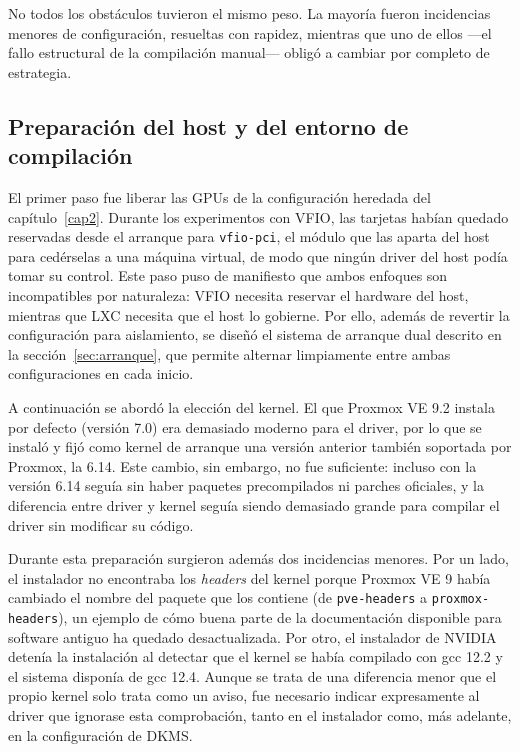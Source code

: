 No todos los obstáculos tuvieron el mismo peso. La mayoría fueron incidencias menores de configuración, resueltas con rapidez, mientras que uno de ellos ---el fallo estructural de la compilación manual--- obligó a cambiar por completo de estrategia.

\subsection{Preparación del host y del entorno de compilación} \label{sec:cap3-preparacion}

El primer paso fue liberar las GPUs de la configuración heredada del capítulo~\ref{cap2}. Durante los 
experimentos con VFIO, las tarjetas habían quedado reservadas desde el arranque para \texttt{vfio-pci}, 
el módulo que las aparta del host para cedérselas a una máquina virtual, de modo que ningún driver del host 
podía tomar su control. Este paso puso de manifiesto que ambos enfoques son incompatibles por naturaleza: 
VFIO necesita reservar el hardware del host, mientras que LXC necesita que el host lo gobierne. Por ello, 
además de revertir la configuración para aislamiento, se diseñó el sistema de arranque dual descrito en la sección~\ref{sec:arranque},
que permite alternar limpiamente entre ambas configuraciones en cada inicio.

A continuación se abordó la elección del kernel. El que Proxmox VE 9.2 instala por defecto (versión 7.0) era demasiado moderno para el driver, por lo que se instaló y fijó como kernel de arranque una versión anterior también soportada por Proxmox, la 6.14. Este cambio, sin embargo,
no fue suficiente: incluso con la versión 6.14 seguía sin haber paquetes precompilados ni parches oficiales, y la diferencia entre driver y kernel seguía siendo demasiado grande para compilar el driver sin modificar su código.

Durante esta preparación surgieron además dos incidencias menores. Por un lado, el instalador no encontraba los \textit{headers} del kernel porque Proxmox VE 9 había cambiado el nombre del paquete que los contiene (de \texttt{pve-headers} a \texttt{proxmox-headers}), un ejemplo de cómo buena parte de la documentación disponible para software antiguo ha quedado desactualizada. Por otro, el instalador de NVIDIA detenía la instalación al detectar que el kernel se había compilado con gcc 12.2 y el sistema disponía de gcc 12.4. Aunque se trata de una diferencia menor que el propio kernel solo trata como un aviso, fue necesario indicar expresamente al driver que ignorase esta comprobación, tanto en el instalador como, más adelante, en la configuración de DKMS.

